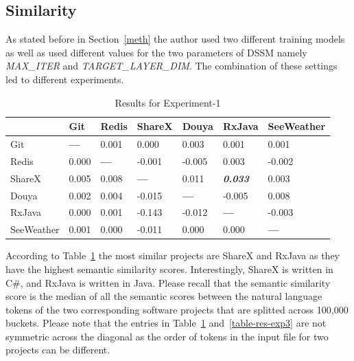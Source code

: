 \documentclass[conference]{IEEEtran}
\begin{document}
\subsection{Similarity}
\label{res_similarity}

As stated before in Section~\ref{meth} the author used two different training models as well as used different values for the two parameters of DSSM namely \textit{MAX\_ITER} and \textit{TARGET\_LAYER\_DIM}. The combination of these settings led to different experiments. 
\begin{table}[]
\centering
\caption{Results for Experiment-1}
\label{table-res-exp1}
\begin{tabular}{lllllll}
\hline
           & Git & Redis & ShareX & Douya & RxJava & SeeWeather \\
\hline
Git        & \bf{---} & 0.001 & 0.000 & 0.003 & 0.001 & 0.001 \\
Redis      & 0.000 & \bf{---} &  -0.001 &  -0.005 &  0.003 & -0.002 \\
ShareX     & 0.005 & 0.008 & \bf{---} & 0.011 & \bf{\textit{0.033}} & 0.003 \\
Douya      & 0.002 & 0.004 & -0.015 & \bf{---} &  -0.005 & 0.008  \\
RxJava     & 0.000  & 0.001 & -0.143 & -0.012 & \bf{---} & -0.003  \\     
SeeWeather & 0.001 & 0.000 & -0.011 & 0.000 & 0.000 & \bf{---} \\     
\hline
\end{tabular}
\end{table}

According to Table~\ref{table-res-exp1} the most similar projects are ShareX and RxJava as they have the highest semantic similarity scores. Interestingly, ShareX is written in C\#, and RxJava is written in Java. Please recall that the semantic similarity score is the median of all the semantic scores between the natural language tokens of the two corresponding software projects that are splitted across 100,000 buckets. Please note that the entries in Table~\ref{table-res-exp1} and~\ref{table-res-exp3} are not symmetric across the diagonal as the order of tokens in the input file for two projects can be different.  
\end{document}
